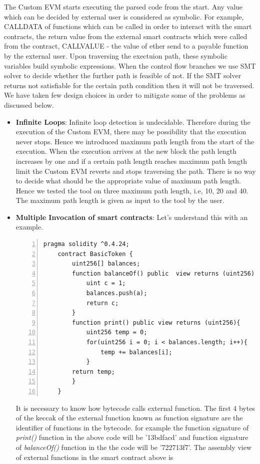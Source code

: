 The Custom EVM starts executing the parsed code from the start. Any value which can be decided by external user is considered as symbolic. For example, CALLDATA of functions which can be called in order to interact with the smart contracts, the return value from the external smart contracts which were called from the contract, CALLVALUE - the value of ether send to a payable function by the external user. Upon traversing the exectuion path, these symbolic variables build symbolic expressions. When the control flow branches we use SMT solver to decide whether the further path is feasible of not. If the SMT solver returns not satisfiable for the certain path condition then it will not be traversed. We have taken few design choices in order to mitigate some of the problems as discussed below. 
\begin{itemize}
    \item \textbf{Infinite Loops}: Infinite loop detection is undecidable. Therefore during the execution of the Custom EVM, there may be possibility that the execution never stops. Hence we introduced maximum path length from the start of the execution. When the execution arrives at the new block the path length increases by one and if a certain path length reaches maximum path length limit the Custom EVM reverts and stops traversing the path. There is no way to decide what should be the appropriate value of maximum path length. Hence we tested the tool on three maximum path length, i.e, 10, 20 and 40. The maximum path length is given as input to the tool by the user.
    \item \textbf{Multiple Invocation of smart contracts}: Let's understand this with an example.
    \begin{Verbatim}[numbers=left,xleftmargin=5mm]
    pragma solidity ^0.4.24;
    contract BasicToken {
        uint256[] balances;
        function balanceOf() public  view returns (uint256) {
            uint c = 1;
            balances.push(a);
            return c;
        }
        function print() public view returns (uint256){
            uint256 temp = 0;
            for(uint256 i = 0; i < balances.length; i++){
                temp += balances[i];
            }
        return temp;
        }
    }
    \end{Verbatim}
    It is necessary to know how bytecode calls external function. The first 4 bytes of the keccak of the external function known as function signature are the identifier of functions in the bytecode.
    for example the function signature of \emph{print()} function in the above code will be '13bdfacd' and function signature of \emph{balanceOf()} function in the the code will be '722713f7'. The assembly view of external functions in the smart contract above is

\end{itemize}
